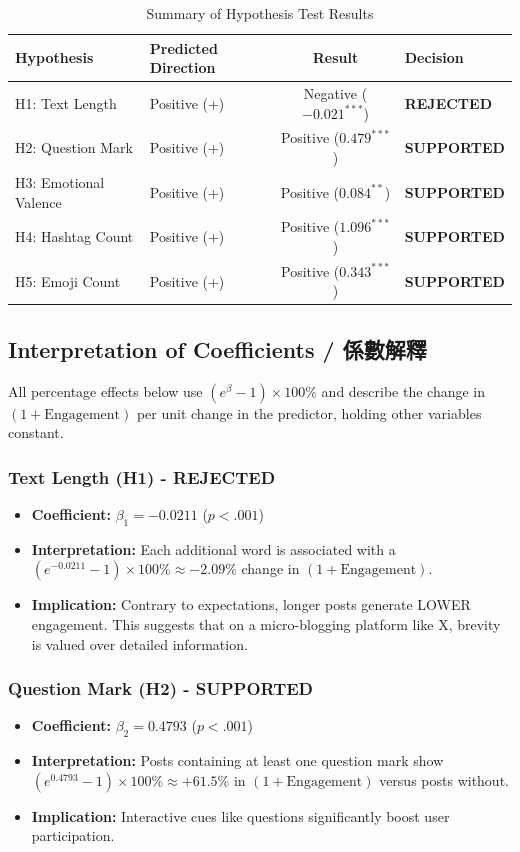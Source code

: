 \documentclass[12pt,a4paper,fontset=none]{ctexart}
\begin{document}
\begin{table}[H]
\centering
\caption{Summary of Hypothesis Test Results}
\small
\begin{tabular}{llcl}
\toprule
Hypothesis & Predicted Direction & Result & Decision \\
\midrule
H1: Text Length & Positive (+) & Negative ($-0.021^{***}$) & \textbf{REJECTED} \\
H2: Question Mark & Positive (+) & Positive ($0.479^{***}$) & \textbf{SUPPORTED} \\
H3: Emotional Valence & Positive (+) & Positive ($0.084^{**}$) & \textbf{SUPPORTED} \\
H4: Hashtag Count & Positive (+) & Positive ($1.096^{***}$) & \textbf{SUPPORTED} \\
H5: Emoji Count & Positive (+) & Positive ($0.343^{***}$) & \textbf{SUPPORTED} \\
\bottomrule
\end{tabular}
\end{table}

\subsection{Interpretation of Coefficients / 係數解釋}

All percentage effects below use $(e^{\beta}-1)\times 100\%$ and describe the change in $(1+\text{Engagement})$ per unit change in the predictor, holding other variables constant.

\subsubsection{Text Length (H1) - REJECTED}
\begin{itemize}
    \item \textbf{Coefficient:} $\beta_1 = -0.0211$ ($p < .001$)
    \item \textbf{Interpretation:} Each additional word is associated with a $(e^{-0.0211}-1)\times 100\% \approx -2.09\%$ change in $(1+\text{Engagement})$.
    \item \textbf{Implication:} Contrary to expectations, longer posts generate LOWER engagement. This suggests that on a micro-blogging platform like X, brevity is valued over detailed information.
\end{itemize}

\subsubsection{Question Mark (H2) - SUPPORTED}
\begin{itemize}
    \item \textbf{Coefficient:} $\beta_2 = 0.4793$ ($p < .001$)
    \item \textbf{Interpretation:} Posts containing at least one question mark show $(e^{0.4793}-1)\times 100\% \approx +61.5\%$ in $(1+\text{Engagement})$ versus posts without.
    \item \textbf{Implication:} Interactive cues like questions significantly boost user participation.
\end{itemize}
\end{document}

